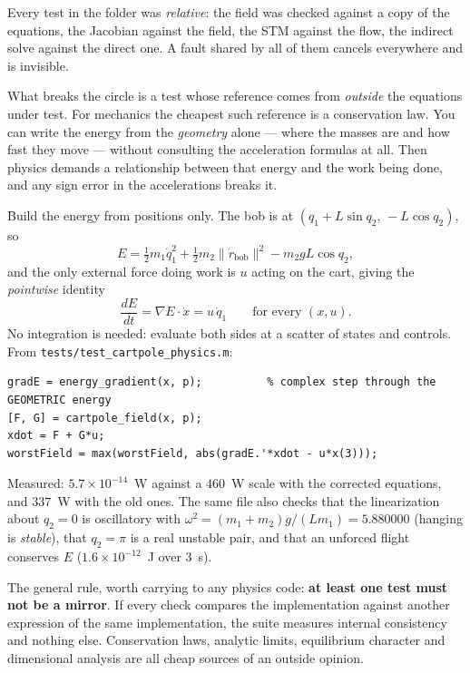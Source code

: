 \documentclass[11pt]{article}
\newcommand{\file}[1]{\texttt{#1}}
\begin{document}
\begin{intu}
Every test in the folder was \emph{relative}: the field was checked against a
copy of the equations, the Jacobian against the field, the STM against the flow,
the indirect solve against the direct one. A fault shared by all of them cancels
everywhere and is invisible.

What breaks the circle is a test whose reference comes from \emph{outside} the
equations under test. For mechanics the cheapest such reference is a
conservation law. You can write the energy from the \emph{geometry} alone ---
where the masses are and how fast they move --- without consulting the
acceleration formulas at all. Then physics demands a relationship between that
energy and the work being done, and any sign error in the accelerations breaks
it.
\end{intu}

\begin{rig}
Build the energy from positions only. The bob is at
$(q_1+L\sin q_2,\,-L\cos q_2)$, so
\[
E=\tfrac12 m_1\dot q_1^2+\tfrac12 m_2\bigl\|\dot r_{\text{bob}}\bigr\|^2-m_2gL\cos q_2 ,
\]
and the only external force doing work is $u$ acting on the cart, giving the
\emph{pointwise} identity
\[
\frac{dE}{dt}=\nabla E\cdot \dot x = u\,\dot q_1 \qquad\text{for every } (x,u).
\]
No integration is needed: evaluate both sides at a scatter of states and
controls. From \file{tests/test\_cartpole\_physics.m}:

\begin{lstlisting}
gradE = energy_gradient(x, p);          % complex step through the GEOMETRIC energy
[F, G] = cartpole_field(x, p);
xdot = F + G*u;
worstField = max(worstField, abs(gradE.'*xdot - u*x(3)));
\end{lstlisting}

Measured: $5.7\times10^{-14}$~W against a $460$~W scale with the corrected
equations, and $337$~W with the old ones. The same file also checks that the
linearization about $q_2=0$ is oscillatory with
$\omega^2=(m_1+m_2)g/(Lm_1)=5.880000$ (hanging is \emph{stable}), that $q_2=\pi$
is a real unstable pair, and that an unforced flight conserves $E$
($1.6\times10^{-12}$~J over 3~s).
\end{rig}

\begin{warn}
The general rule, worth carrying to any physics code: \textbf{at least one test
must not be a mirror}. If every check compares the implementation against
another expression of the same implementation, the suite measures internal
consistency and nothing else. Conservation laws, analytic limits, equilibrium
character and dimensional analysis are all cheap sources of an outside opinion.
\end{warn}
\end{document}
